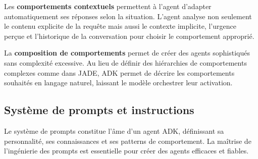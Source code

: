 Les \textbf{comportements contextuels} permettent à l'agent d'adapter automatiquement ses réponses selon la situation. L'agent analyse non seulement le contenu explicite de la requête mais aussi le contexte implicite, l'urgence perçue et l'historique de la conversation pour choisir le comportement approprié.

La \textbf{composition de comportements} permet de créer des agents sophistiqués sans complexité excessive. Au lieu de définir des hiérarchies de comportements complexes comme dans JADE, ADK permet de décrire les comportements souhaités en langage naturel, laissant le modèle orchestrer leur activation.

\subsection{Système de prompts et instructions}

Le système de prompts constitue l'âme d'un agent ADK, définissant sa personnalité, ses connaissances et ses patterns de comportement. La maîtrise de l'ingénierie des prompts est essentielle pour créer des agents efficaces et fiables.

